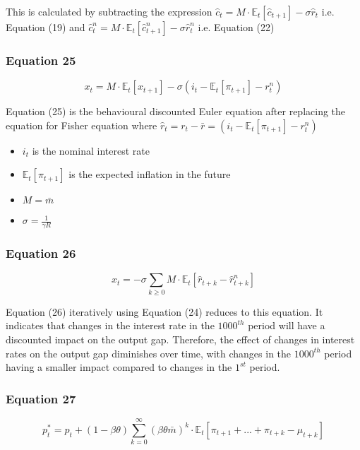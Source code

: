 \documentclass{article}
\begin{document}
This is calculated by subtracting the expression $\hat{c}_{t}=M\cdot\mathbb{E}_{t}\left[\hat{c}_{t+1}\right]-\sigma\hat{r}_{t}$ i.e. Equation (19) and $\hat{c}^{n}_{t} = M\cdot\mathbb{E}_{t}\left[\hat{c}^{n}_{t+1}\right]-\sigma\hat{r}^{n}_{t}$ i.e. Equation (22)

\subsubsection*{Equation 25}
\begin{equation}\tag{25}
    x_{t}=M\cdot\mathbb{E}_{t}\left[x_{t+1}\right]-\sigma(i_{t}-\mathbb{E}_{t}\left[\pi_{t+1}\right]-r^{n}_{t})
\end{equation}

Equation (25) is the behavioural discounted Euler equation after replacing the equation for Fisher equation  where $\hat r_{t}= r_{t}- \bar r = (i_{t}-\mathbb{E}_{t}\left[\pi_{t+1}\right]-r^{n}_{t})$
\begin{itemize}
    \item $i_{t}$ is the nominal interest rate
    \item $\mathbb{E}_{t}\left[\pi_{t+1}\right]$ is the expected inflation in the future
    \item $M=\bar{m}$
    \item $\sigma=\frac{1}{\gamma R}$
\end{itemize}

\subsubsection*{Equation 26}
\begin{equation}\tag{26}
    x_{t}=-\sigma\sum_{k\geq 0}{M\cdot \mathbb{E}_{t}\left[\hat{r}_{t+k}-\hat{r}_{t+k}^{n}\right]}
\end{equation}

Equation (26) iteratively using Equation (24) reduces to this equation. It indicates that changes in the interest rate in the $1000^{th}$ period will have a discounted impact on the output gap. Therefore, the effect of changes in interest rates on the output gap diminishes over time, with changes in the $1000^{th}$ period having a smaller impact compared to changes in the $1^{st}$ period.


\subsubsection*{Equation 27}
\begin{equation}\tag{27}
    p^{*}_{t}=p_{t}+(1-\beta\theta)\sum_{k=0}^{\infty}\left(\beta\theta\bar{m}\right)^{k}\cdot\mathbb{E}_{t}\left[\pi_{t+1}+...+\pi_{t+k}-\mu_{t+k}\right]
\end{equation}
\end{document}
